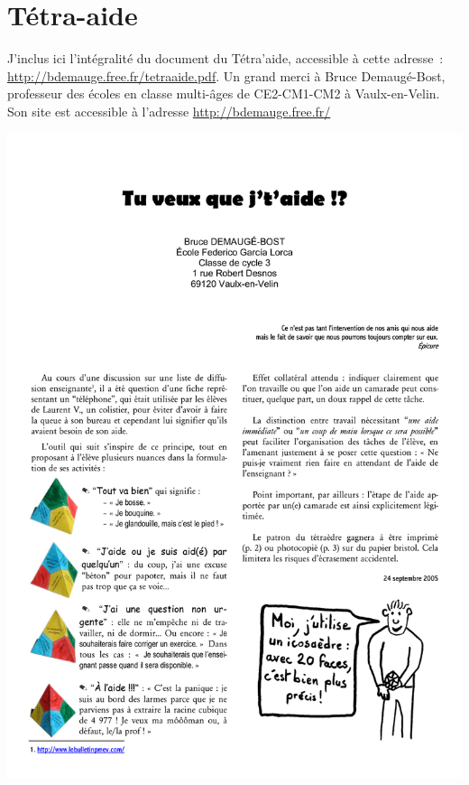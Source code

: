 \section{Tétra-aide}\label{tetraaide}
J'inclus ici l'intégralité du document du Tétra'aide, accessible à cette adresse :
\url{http://bdemauge.free.fr/tetraaide.pdf}. Un grand merci à Bruce Demaugé-Bost,
professeur des écoles en classe multi-âges de CE2-CM1-CM2 à Vaulx-en-Velin.
Son site est accessible à l'adresse \url{http://bdemauge.free.fr/}

\begin{center}
\includegraphics[scale=0.2]{annexes/01_tetraaide_0.png}

\end{center}
